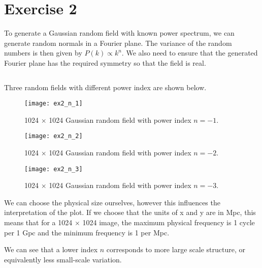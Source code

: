 \section*{Exercise 2}
To generate a Gaussian random field with known power spectrum, we can generate random normals in a Fourier plane.
The variance of the random numbers is then given by $P(k) \propto k^n$.
We also need to ensure that the generated Fourier plane has the required symmetry so that the field is real.

\inputminted[firstline=6, lastline=35]{Python}{../ex2.py}

Three random fields with different power index are shown below.

\begin{figure}[h]
  \centering
  \texttt{[image: ex2\_n\_1]}
  \caption{1024 $\times$ 1024 Gaussian random field with power index $n=-1$.}
\end{figure}
\begin{figure}[h]
  \centering
  \texttt{[image: ex2\_n\_2]}
  \caption{1024 $\times$ 1024 Gaussian random field with power index $n=-2$.}
\end{figure}
\begin{figure}[h]
  \centering
  \texttt{[image: ex2\_n\_3]}
  \caption{1024 $\times$ 1024 Gaussian random field with power index $n=-3$.}
\end{figure}

We can choose the physical size ourselves, however this influences the interpretation of the plot.
If we choose that the units of x and y are in Mpc, this means that for a 1024 $\times$ 1024 image,
the maximum physical frequency is 1 cycle per 1 Gpc and the minimum frequency is 1 per Mpc.

We can see that a lower index $n$ corresponds to more large scale structure, or equivalently less small-scale variation.
\clearpage
